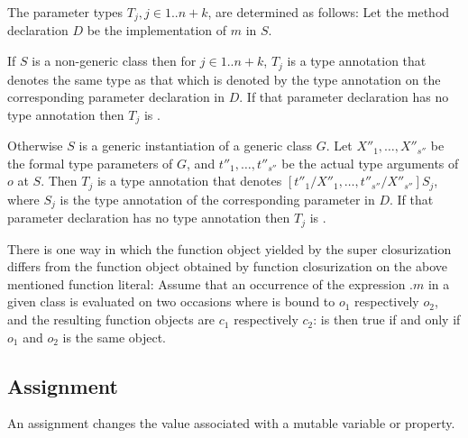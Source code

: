 \documentclass[makeidx]{article}
\begin{document}


\LMHash{}%
The parameter types $T_j, j \in 1 .. n+k$, are determined as follows:
Let the method declaration $D$ be the implementation of $m$ in $S$.

\LMHash{}%
If $S$ is a non-generic class then for $j \in 1 .. n+k$,
$T_j$ is a type annotation that denotes the same type as that which is denoted by the type annotation on the corresponding parameter declaration in $D$.
If that parameter declaration has no type annotation then $T_j$ is \DYNAMIC{}.

\LMHash{}%
Otherwise $S$ is a generic instantiation of a generic class $G$.
Let $X''_1, \ldots, X''_{s''}$ be the formal type parameters of $G$,
and $t''_1, \ldots, t''_{s''}$ be the actual type arguments of $o$ at $S$.
Then $T_j$ is a type annotation that denotes $[t''_1/X''_1, \ldots, t''_{s''}/X''_{s''}]S_j$,
where $S_j$ is the type annotation of the corresponding parameter in $D$.
If that parameter declaration has no type annotation then $T_j$ is \DYNAMIC{}.

\LMHash{}%
There is one way in which
the function object yielded by the super closurization differs from
the function object obtained by function closurization on the above mentioned function literal:
Assume that an occurrence of the expression \SUPER{}.$m$ in a given class
is evaluated on two occasions where \THIS{} is bound to $o_1$ respectively $o_2$,
and the resulting function objects are $c_1$ respectively $c_2$:
 is then true if and only if $o_1$ and $o_2$ is the same object.


\subsection{Assignment}

\LMHash{}%
An assignment changes the value associated with a mutable variable or property.
\end{document}
